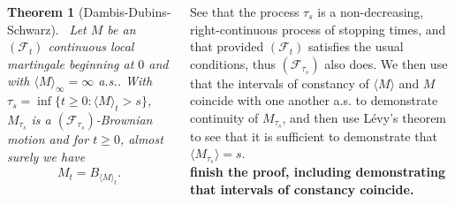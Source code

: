 \documentclass{tikzposter} %
\newtheorem{theorem}{Theorem}
\begin{document}
\begin{columns}
{      \begin{theorem}[Dambis-Dubins-Schwarz]
        \ Let $M$ be an $(\mathcal{F}_{t})$ continuous local martingale beginning at $0$ and with $\langle M \rangle_{\infty} = \infty$ a.s.. With $\tau_{s} = \inf \{t \ge 0 : \langle M \rangle_{t} > s\}$, $M_{\tau_{s}}$ is a $(\mathcal{F}_{\tau_{s}})$-Brownian motion and for $t \ge 0$, almost surely we have
        \begin{align*}
          M_{t} = B_{\langle M \rangle_{t}}.
        \end{align*}
      \end{theorem}

      See that the process $\tau_{s}$ is a non-decreasing, right-continuous process of stopping times, and that provided $(\mathcal{F}_{t})$ satisfies the usual conditions, thus $(\mathcal{F}_{\tau_{s}})$ also does. We then use that the intervals of constancy of $\langle M \rangle$ and $M$ coincide with one another a.s. to demonstrate continuity of $M_{\tau_{s}}$, and then use L\'evy's theorem to see that it is sufficient to demonstrate that $\langle M_{\tau_{s}} \rangle = s$. \\

      \textbf{finish the proof, including demonstrating that intervals of constancy coincide.}
      }
\end{columns}
\end{document}
